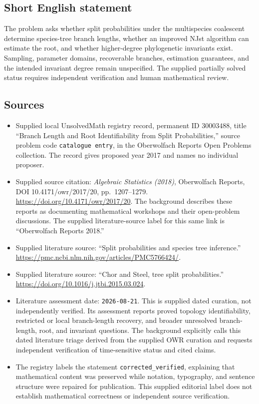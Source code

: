 \documentclass[11pt]{article}
\begin{document}
\subsection{Short English statement}
The problem asks whether split probabilities under the multispecies coalescent determine species-tree branch lengths, whether an improved NJst algorithm can estimate the root, and whether higher-degree phylogenetic invariants exist. Sampling, parameter domains, recoverable branches, estimation guarantees, and the intended invariant degree remain unspecified. The supplied partially solved status requires independent verification and human mathematical review.
\subsection{Sources}
\begin{itemize}
\item Supplied local UnsolvedMath registry record, permanent ID \(30003488\), title ``Branch Length and Root Identifiability from Split Probabilities,'' source problem code \texttt{catalogue entry}, in the Oberwolfach Reports Open Problems collection. The record gives proposed year 2017 and names no individual proposer.
\item Supplied source citation: \emph{Algebraic Statistics (2018)}, Oberwolfach Reports, DOI 10.4171/owr/2017/20, pp.~1207--1279. \url{https://doi.org/10.4171/owr/2017/20}. The background describes these reports as documenting mathematical workshops and their open-problem discussions. The supplied literature-source label for this same link is ``Oberwolfach Reports 2018.''
\item Supplied literature source: ``Split probabilities and species tree inference.'' \url{https://pmc.ncbi.nlm.nih.gov/articles/PMC5766424/}.
\item Supplied literature source: ``Chor and Steel, tree split probabilities.'' \url{https://doi.org/10.1016/j.jtbi.2015.03.024}.
\item Literature assessment date: \texttt{2026-08-21}. This is supplied dated curation, not independently verified. Its assessment reports proved topology identifiability, restricted or local branch-length recovery, and broader unresolved branch-length, root, and invariant questions. The background explicitly calls this dated literature triage derived from the supplied OWR curation and requests independent verification of time-sensitive status and cited claims.
\item The registry labels the statement \texttt{corrected\_verified}, explaining that mathematical content was preserved while notation, typography, and sentence structure were repaired for publication. This supplied editorial label does not establish mathematical correctness or independent source verification.
\end{itemize}
\end{document}
